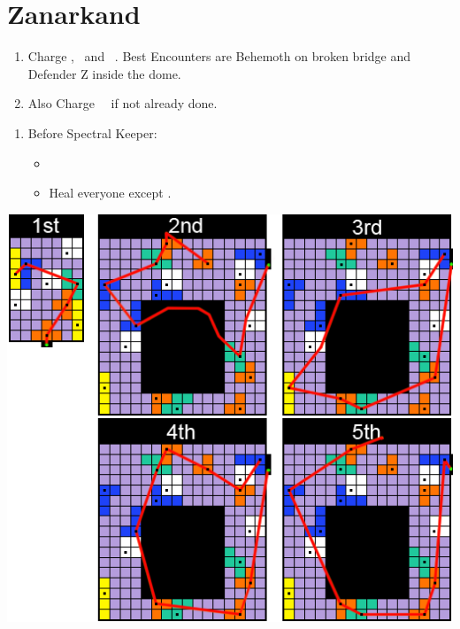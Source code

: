 \chapter{Zanarkand}
\begin{enumerate}
	\item Charge \tidus, \rikku\ and \lulu\ \od. Best Encounters are Behemoth on broken bridge and Defender Z inside the dome.
	\item Also Charge \yuna\ \od\ if not already done.
\end{enumerate}
\begin{enumerate}[resume]
	\item Before Spectral Keeper:
	\begin{itemize}
		\item \formation{\rikku}{\lulu}{\auron}
		\item Heal everyone except \rikku. %
	\end{itemize}
\end{enumerate}
\includegraphics[width=.95\columnwidth]{graphics/Zanarkand_Trials}

